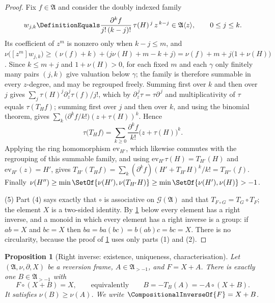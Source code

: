 \documentclass[11pt,oneside]{article}
\theoremstyle{plain}
\newtheorem{proposition}[theorem]{Proposition}
\theoremstyle{definition}
\theoremstyle{remark}
\newcommand{\compose}{\mathbin{\circ}}
\newcommand{\rev}[1]{\CompositionalInverseOf{#1}}
\begin{document}
\begin{proof}
Fix \(f\in\mathfrak A\) and consider the doubly indexed family
\[
  w_{j,k}\DefinitionEquals
  \frac{\partial^kf}{j!\,(k-j)!}\,\tau(H)^{\,j}\,z^{\,k-j}
  \in\mathfrak A\langle z\rangle,
  \qquad 0\le j\le k .
\]
Its coefficient of \(z^m\) is nonzero only when \(k-j\le m\), and
\(\nu\bigl([z^m]w_{j,k}\bigr)\ge(\nu(f)+k)+\bigl(j\nu(H)+m-k+j\bigr)
=\nu(f)+m+j\bigl(1+\nu(H)\bigr)\).  Since \(k\le m+j\) and
\(1+\nu(H)>0\), for each fixed \(m\) and each \(\gamma\) only finitely many
pairs \((j,k)\) give valuation below \(\gamma\); the family is therefore
summable in every \(z\)-degree, and may be regrouped freely.  Summing first
over \(k\) and then over \(j\) gives
\(\sum_{j}\tau(H)^j\partial_z^{\,j}\tau(f)/j!\), which by
\(\partial_z^{\,j}\tau=\tau\partial^{\,j}\) and multiplicativity of \(\tau\)
equals \(\tau(T_Hf)\); summing first over \(j\) and then over \(k\), and using
the binomial theorem, gives \(\sum_k\bigl(\partial^kf/k!\bigr)(z+\tau(H))^k\).
Hence
\[
  \tau\bigl(T_H f\bigr)
  =\sum_{k\ge0}\frac{\partial^kf}{k!}\bigl(z+\tau(H)\bigr)^k .
\]
Applying the ring homomorphism \(\mathrm{ev}_{H'}\), which likewise commutes
with the regrouping of this summable family, and using
\(\mathrm{ev}_{H'}\tau(H)=T_{H'}(H)\) and \(\mathrm{ev}_{H'}(z)=H'\), gives
\(T_{H'}(T_Hf)=\sum_k(\partial^kf)(H'+T_{H'}H)^k/k!=T_{H''}(f)\).  Finally
\(\nu(H'')\ge\min\SetOf{\nu(H'),\nu(T_{H'}H)}\ge
\min\SetOf{\nu(H'),\nu(H)}>-1\).

(5)  Part (4) says exactly that \(\compose\) is associative on
\(\mathcal G(\mathfrak A)\) and that \(T_{F\compose G}=T_G\compose T_F\); the
element \(X\) is a two-sided identity.  By
\cref{plt:prop:lag-fixed-point} below every element has a right inverse, and a
monoid in which every element has a right inverse is a group: if \(ab=X\) and
\(bc=X\) then \(ba=ba(bc)=b(ab)c=bc=X\).  There is no circularity, because the
proof of \cref{plt:prop:lag-fixed-point} uses only parts (1) and (2).
\end{proof}

\begin{proposition}[Right inverse: existence, uniqueness, characterisation]
\label{plt:prop:lag-fixed-point}
Let \((\mathfrak A,\nu,\partial,X)\) be a reversion frame,
\(A\in\mathfrak A_{>-1}\), and \(F=X+A\).  There is exactly one
\(B\in\mathfrak A_{>-1}\) with
\begin{equation}
\label{plt:eq:lag-fixedpoint}
  F\compose(X+B)=X,
  \qquad\text{equivalently}\qquad
  B=-T_B(A)=-A\compose(X+B).
\end{equation}
It satisfies \(\nu(B)\ge\nu(A)\).  We write \(\rev{F}=X+B\).
\end{proposition}
\end{document}
